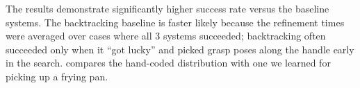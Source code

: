 The results demonstrate significantly higher success rate versus the baseline systems. The backtracking baseline is faster likely because
the refinement times were averaged over cases where all 3 systems succeeded; backtracking often succeeded only when
it ``got lucky'' and picked grasp poses along the handle early in the search.  compares the hand-coded
distribution with one we learned for picking up a frying pan.